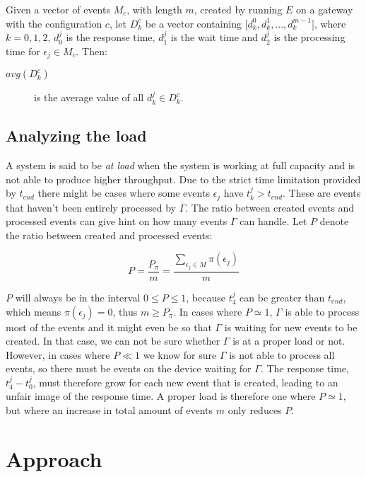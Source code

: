 Given a vector of events $M_c$, with length $m$, created by running $E$ on a
gateway with the configuration $c$, let $D_k^c$ be a vector containing $\big[
    d_k^0, d_k^1, ..., d_k^{m-1} \big]$, where $k = 0, 1, 2$, $d_0^j$ is the
response time, $d_1^j$ is the wait time and $d_2^j$ is the processing time for
$\epsilon_j \in M_c$. Then:

\begin{description}

    \item[$avg(D_k^c)$] is the average value of all $d_k^j \in D_k^c$.

\end{description}

\subsection{Analyzing the load}
\label{sec:load}

A system is said to be \textit{at load} when the system is working at full
capacity and is not able to produce higher throughput. Due to the strict time
limitation provided by $t_{end}$ there might be cases where some events
$\epsilon_j$ have $t_k^j > t_{end}$. These are events that haven't been
entirely processed by $\Gamma$. The ratio between created events and processed
events can give hint on how many events $\Gamma$ can handle. Let $P$ denote the
ratio between created and processed events:

$$
P = \frac{P_\pi}{m} = \frac{\sum_{\epsilon_j \in M}{\pi(\epsilon_j)}}{m}
$$

$P$ will always be in the interval $0 \leq P \leq 1$, because $t_4^j$ can be
greater than $t_{end}$, which means $\pi(\epsilon_j) = 0$, thus $m \geq P_\pi$.
In cases where $P \simeq 1$, $\Gamma$ is able to process most of the events and
it might even be so that $\Gamma$ is waiting for new events to be created. In
that case, we can not be sure whether $\Gamma$ is at a proper load or not.
However, in cases where $P \ll 1$ we know for sure $\Gamma$ is not able to
process all events, so there must be events on the device waiting for $\Gamma$.
The response time, $t_4^j - t_0^j$, must therefore grow for each new event that
is created, leading to an unfair image of the response time. A proper load is
therefore one where $P \simeq 1$, but where an increase in total amount of
events $m$ only reduces $P$.

\section{Approach}

